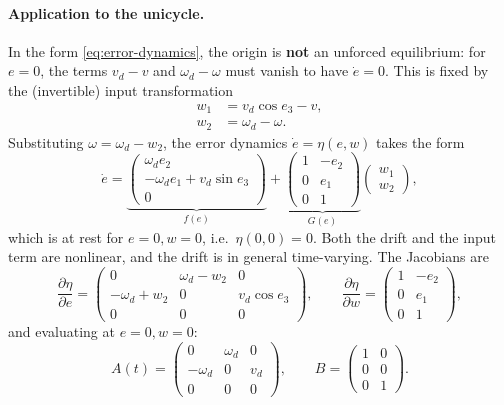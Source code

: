 \paragraph{Application to the unicycle.}
In the form \cref{eq:error-dynamics}, the origin is \textbf{not} an
unforced equilibrium: for \( e = 0 \), the terms \( v_d - v \) and
\( \omega_d - \omega \) must vanish to have \( \dot{e} = 0 \). This is
fixed by the (invertible) input transformation
\begin{align}
    w_1 &= v_d \cos e_3 - v, \\
    w_2 &= \omega_d - \omega.
\end{align}
Substituting \( \omega = \omega_d - w_2 \), the error dynamics
\( \dot{e} = \eta(e, w) \) takes the form
\begin{equation}
    \dot{e} = \underbrace{
    \begin{pmatrix}
        \omega_d e_2 \\
        -\omega_d e_1 + v_d \sin e_3 \\
        0
    \end{pmatrix}}_{f(e)}
    +
    \underbrace{
    \begin{pmatrix}
        1 & -e_2 \\
        0 & e_1 \\
        0 & 1
    \end{pmatrix}}_{G(e)}
    \begin{pmatrix} w_1 \\ w_2 \end{pmatrix},
\end{equation}
which is at rest for \( e = 0, w = 0 \), i.e.\
\( \eta(0, 0) = 0 \). Both the drift and the input term are
nonlinear, and the drift is in general time-varying. The Jacobians are
\[
\frac{\partial \eta}{\partial e} =
\begin{pmatrix}
    0 & \omega_d - w_2 & 0 \\
    -\omega_d + w_2 & 0 & v_d \cos e_3 \\
    0 & 0 & 0
\end{pmatrix},
\qquad
\frac{\partial \eta}{\partial w} =
\begin{pmatrix}
    1 & -e_2 \\
    0 & e_1 \\
    0 & 1
\end{pmatrix},
\]
and evaluating at \( e = 0, w = 0 \):
\begin{equation}
\label{eq:A-tracking}
    A(t) =
    \begin{pmatrix}
        0 & \omega_d & 0 \\
        -\omega_d & 0 & v_d \\
        0 & 0 & 0
    \end{pmatrix},
    \qquad
    B =
    \begin{pmatrix}
        1 & 0 \\
        0 & 0 \\
        0 & 1
    \end{pmatrix}.
\end{equation}
